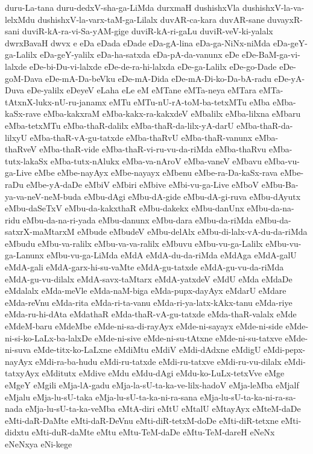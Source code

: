{duru-La-tana
duru-dedxV-sha-ga-LiMda
durxmaH
dushishxVla
dushishxV-la-va-lelxMdu
dushishxV-la-varx-taM-ga-Lilalx
duvAR-ca-kara
duvAR-sane
duvayxR-sani
duviR-kA-ra-vi-Sa-yAM-gige
duviR-kA-ri-gaLu
duviR-veV-ki-yalalx
dwrxBavaH
dwvx
e
eDa
eDada
eDade
eDa-gA-lina
eDa-ga-NiNx-niMda
eDa-geY-ga-Lalilx
eDa-geY-yalilx
eDa-ha-satxda
eDa-pA-da-vanunx
eDe
eDe-BaM-ga-vi-lalxde
eDe-bi-Du-vi-lalxde
eDe-de-ra-hi-lalxda
eDe-ga-Lalilx
eDe-go-Dade
eDe-goM-Dava
eDe-mA-Da-beVku
eDe-mA-Dida
eDe-mA-Di-ko-Da-bA-radu
eDe-yA-Duva
eDe-yalilx
eDeyeV
eLaha
eLe
eM
eMTane
eMTa-neya
eMTara
eMTa-tAtxnX-lukx-nU-ru-janamx
eMTu
eMTu-nU-rA-toM-ba-tetxMTu
eMba
eMba-kaSx-rave
eMba-kakxraM
eMba-kakx-ra-kakxdeV
eMbalilx
eMba-lilxna
eMbaru
eMba-tetxMTu
eMba-thaR-dalilx
eMba-thaR-da-lilx-yA-darU
eMba-thaR-da-lilxyU
eMba-thaR-vA-gu-tatxde
eMba-thaRvU
eMba-thaR-vanunx
eMba-thaRveV
eMba-thaR-vide
eMba-thaR-vi-ru-vu-da-riMda
eMba-thaRvu
eMba-tutx-lakaSx
eMba-tutx-nAlukx
eMba-va-nAroV
eMba-vaneV
eMbavu
eMba-vu-ga-Live
eMbe
eMbe-nayAyx
eMbe-nayayx
eMbenu
eMbe-ra-Da-kaSx-rava
eMbe-raDu
eMbe-yA-daDe
eMbiV
eMbiri
eMbive
eMbi-vu-ga-Live
eMboV
eMbu-Ba-ya-va-neV-neM-buda
eMbu-dAgi
eMbu-dA-gide
eMbu-dA-gi-ruva
eMbu-dAyutx
eMbu-daSeTxV
eMbu-da-kakxthaR
eMbu-dakekx
eMbu-danUnx
eMbu-da-na-ridu
eMbu-da-na-ri-yada
eMbu-danunx
eMbu-dara
eMbu-da-riMda
eMbu-da-satxrX-maMtarxM
eMbude
eMbudeV
eMbu-delAlx
eMbu-di-lalx-vA-du-da-riMda
eMbudu
eMbu-va-ralilx
eMbu-va-va-ralilx
eMbuvu
eMbu-vu-ga-Lalilx
eMbu-vu-ga-Lanunx
eMbu-vu-ga-LiMda
eMdA
eMdA-du-da-riMda
eMdAga
eMdA-galU
eMdA-gali
eMdA-garx-hi-su-vaMte
eMdA-gu-tatxde
eMdA-gu-vu-da-riMda
eMdA-gu-vu-dilalx
eMdA-savx-taMtarx
eMdA-yatxdeV
eMdU
eMda
eMdaDe
eMdalalx
eMda-meVle
eMda-naM-biga
eMda-pupx-dayAyx
eMdarU
eMdare
eMda-reVnu
eMda-rita
eMda-ri-ta-vanu
eMda-ri-ya-latx-kAkx-tanu
eMda-riye
eMda-ru-hi-dAta
eMdathaR
eMda-thaR-vA-gu-tatxde
eMda-thaR-valalx
eMde
eMdeM-baru
eMdeMbe
eMde-ni-sa-di-rayAyx
eMde-ni-sayayx
eMde-ni-side
eMde-ni-si-ko-LaLx-ba-lalxDe
eMde-ni-sive
eMde-ni-su-tAtxne
eMde-ni-su-tatxve
eMde-ni-suva
eMde-titx-ko-LaLxne
eMdiMtu
eMdiV
eMdi-dAdxne
eMdigU
eMdi-pepx-nayAyx
eMdi-ra-ba-hudu
eMdi-ru-tatxde
eMdi-ru-tatxve
eMdi-ru-vu-dilalx
eMdi-tatxyAyx
eMditutx
eMdive
eMdu
eMdu-dAgi
eMdu-ko-LuLx-tetxVve
eMge
eMgeY
eMgili
eMja-lA-gadu
eMja-la-sU-ta-ka-ve-lilx-hadoV
eMja-leMba
eMjalf
eMjalu
eMja-lu-sU-taka
eMja-lu-sU-ta-ka-ni-ra-sana
eMja-lu-sU-ta-ka-ni-ra-sa-nada
eMja-lu-sU-ta-ka-veMba
eMtA-diri
eMtU
eMtalU
eMtayAyx
eMteM-daDe
eMti-daR-DaMte
eMti-daR-DeVnu
eMti-diR-tetxM-doDe
eMti-diR-tetxne
eMti-didxtu
eMti-duR-daMte
eMtu
eMtu-TeM-daDe
eMtu-TeM-dareH
eNeNx
eNeNxya
eNi-kege
}
